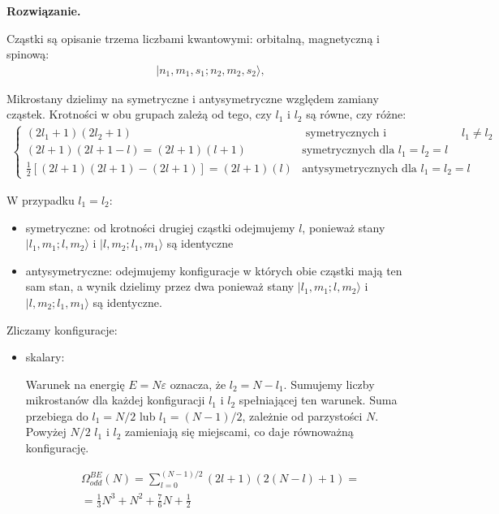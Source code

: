 \documentclass[11pt,a4paper]{article}
\newenvironment{solution}{\vspace{1cm} \par\textbf{Rozwiązanie.} \vspace{1cm}}{}
\begin{document}
\begin{solution}

Cząstki są opisanie trzema liczbami kwantowymi: 
orbitalną, magnetyczną i spinową:
\begin{align*}
|n_1, m_1, s_1; n_2, m_2, s_2\rangle,
\end{align*}

Mikrostany dzielimy na symetryczne i antysymetryczne względem zamiany cząstek.
Krotności w obu grupach zależą od tego, czy $l_1$ i $l_2$ są równe, czy różne:
\begin{align*}
\begin{cases}
(2l_{1}+1)(2l_{2}+1)  & \text{ symetrycznych i antysymetrycznych } l_1 \neq l_2 \\
(2l+1)(2l+1 - l) = (2l+1)(l + 1) & \text{symetrycznych dla } l_1 = l_2 = l \\
\frac{1}{2}[(2l+1)(2l+1) - (2l+1)] = (2l+1)(l) & \text{antysymetrycznych dla } l_1 = l_2 = l
\end{cases}
\end{align*}

W przypadku $l_{1}=l_{2}$:
\begin{itemize}
  \item symetryczne: od krotności drugiej cząstki odejmujemy $l$,
         ponieważ stany  $|l_1, m_1; l, m_2\rangle $ i $|l, m_2; l_1, m_1\rangle$ są identyczne
  \item antysymetryczne: odejmujemy konfiguracje w których obie cząstki mają
        ten sam stan, a wynik dzielimy przez dwa ponieważ stany  $|l_1, m_1; l, m_2\rangle $ i 
        $|l, m_2; l_1, m_1\rangle$ są identyczne.
\end{itemize}

\vskip 0.5cm

Zliczamy konfiguracje:


\begin{itemize}
\item skalary:

Warunek na energię $E = N\varepsilon$ oznacza, że $l_2 = N - l_1$.
Sumujemy liczby mikrostanów dla każdej konfiguracji $l_1$ i $l_2$ 
spełniającej ten warunek. Suma przebiega do $l_1 = N/2$ lub $l_1= (N-1)/2$,
zależnie od parzystości $N$. Powyżej $N/2$ $l_1$ i $l_2$ zamieniają się miejscami, 
co daje równoważną konfigurację. 

\begin{align*}
\Omega_{odd}^{BE}(N) = 
\sum_{l=0}^{(N-1)/2} (2l+1)(2(N-l)+1) = \\
 = \frac{1}{3}N^3 + N^2 + \frac{7}{6}N + \frac{1}{2}
\end{align*}


\end{itemize}
\end{solution}
\end{document}

